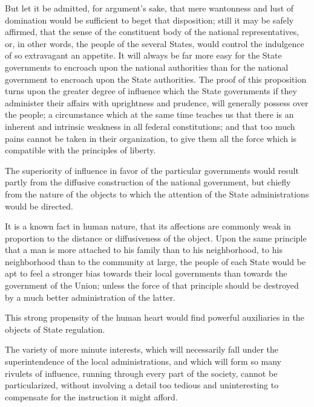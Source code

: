 But let it be admitted, for argument's sake, that mere wantonness and lust of domination would be sufficient to beget that disposition; still it may be safely affirmed, that the sense of the constituent body of the national representatives, or, in other words, the people of the several States, would control the indulgence of so extravagant an appetite. It will always be far more easy for the State governments to encroach upon the national authorities than for the national government to encroach upon the State authorities. The proof of this proposition turns upon the greater degree of influence which the State governments if they administer their affairs with uprightness and prudence, will generally possess over the people; a circumstance which at the same time teaches us that there is an inherent and intrinsic weakness in all federal constitutions; and that too much pains cannot be taken in their organization, to give them all the force which is compatible with the principles of liberty.

The superiority of influence in favor of the particular governments would result partly from the diffusive construction of the national government, but chiefly from the nature of the objects to which the attention of the State administrations would be directed.

It is a known fact in human nature, that its affections are commonly weak in proportion to the distance or diffusiveness of the object. Upon the same principle that a man is more attached to his family than to his neighborhood, to his neighborhood than to the community at large, the people of each State would be apt to feel a stronger bias towards their local governments than towards the government of the Union; unless the force of that principle should be destroyed by a much better administration of the latter.

This strong propensity of the human heart would find powerful auxiliaries in the objects of State regulation.

The variety of more minute interests, which will necessarily fall under the superintendence of the local administrations, and which will form so many rivulets of influence, running through every part of the society, cannot be particularized, without involving a detail too tedious and uninteresting to compensate for the instruction it might afford.

